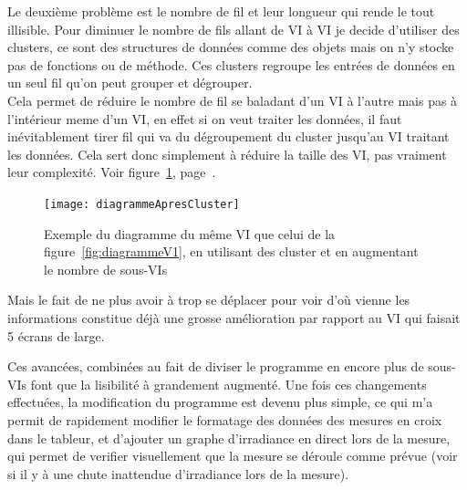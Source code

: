 \documentclass[12pt]{article}
\begin{document}
Le deuxième problème est le nombre de fil et leur longueur qui rende le tout illisible.
Pour diminuer le nombre de fils allant de VI à VI je decide d'utiliser des clusters, ce sont des structures de données comme des objets mais on n'y stocke pas de fonctions ou de méthode.
Ces clusters regroupe les entrées de données en un seul fil qu'on peut grouper et dégrouper.\\
Cela permet de réduire le nombre de fil se baladant d'un VI à l'autre mais pas à l'intérieur meme d'un VI, en effet si on veut traiter les données, il faut inévitablement tirer fil qui va du dégroupement du cluster jusqu'au VI traitant les données.
Cela sert donc simplement à réduire la taille des VI, pas vraiment leur complexité.
Voir figure~\ref{fig:diagApresCluster}, page~\pageref{fig:diagApresCluster}.
\begin{figure}[h]
	\centering
	\texttt{[image: diagrammeApresCluster]}
	\caption{Exemple du diagramme du même VI que celui de la figure~\ref{fig:diagrammeV1}, en utilisant des cluster et en augmentant le nombre de sous-VIs}
	\label{fig:diagApresCluster}
\end{figure}
Mais le fait de ne plus avoir à trop se déplacer pour voir d'où vienne les informations constitue déjà une grosse amélioration par rapport au VI qui faisait 5 écrans de large.


Ces avancées, combinées au fait de diviser le programme en encore plus de sous-VIs font que la lisibilité à grandement augmenté.
Une fois ces changements effectuées, la modification du programme est devenu plus simple, ce qui m'a permit de rapidement modifier le formatage des données des mesures en croix dans le tableur, et d'ajouter un graphe d'irradiance en direct lors de la mesure, qui permet de verifier visuellement que la mesure se déroule comme prévue (voir si il y à une chute inattendue d'irradiance lors de la mesure).
\end{document}
